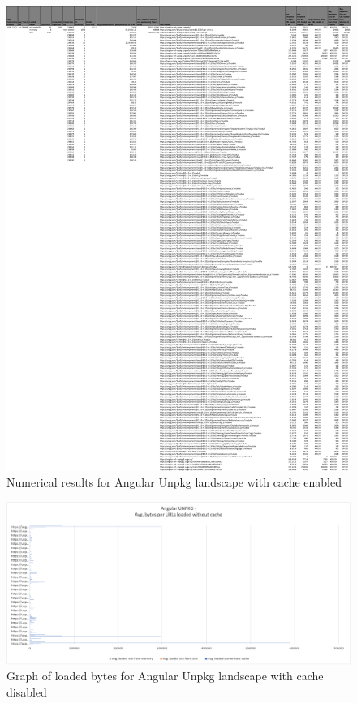 \begin{figure}[!h]
	\centering
	\begin{adjustbox}{width=\textwidth,totalheight=0.95\textheight}
		\includegraphics[angle=90]{Figures/angular_unpkg_allhar_cache.pdf}
	\end{adjustbox}
	\caption{Numerical results for Angular Unpkg landscape with cache enabled}
	\label{fig:appendix_1_7}
\end{figure}
\newpage
\begin{figure}[!h]
	\centering
	\includegraphics[width=1.4\textwidth, angle=90]{Figures/angular_unpkg_bytes.png}
	\caption{Graph of loaded bytes for Angular Unpkg landscape with cache disabled}
	\label{fig:appendix_1_8}
\end{figure}
